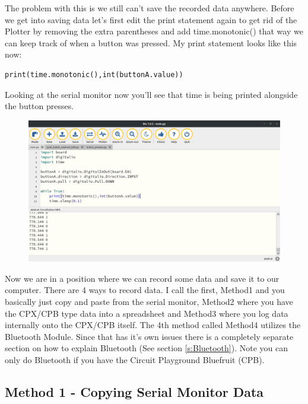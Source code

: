 The problem with this is we still can’t save the recorded data
anywhere. Before we get into saving data let’s first edit the print
statement again to get rid of the Plotter by removing the extra
parentheses and add time.monotonic() that way we can keep track of
when a button was pressed. My print statement looks like this now: 
\begin{verbatim}
print(time.monotonic(),int(buttonA.value))
\end{verbatim}
Looking at the serial monitor now you’ll see that time is being
printed alongside the button presses. 
\begin{figure}[H]
  \begin{center}
    \includegraphics[width=\textwidth]{Figures/MuPlotterTime.png}
  \end{center}
\end{figure}
Now we are in a position where we can record some data and save it to
our computer. There are 4 ways to record data. I call the first,
Method1 and you basically just copy and paste from the serial monitor,
Method2 where you have the CPX/CPB type data into a spreadsheet and
Method3 where you log data internally onto the CPX/CPB itself. The 4th
method called Method4 utilizes the Bluetooth Module. Since that has
it's own issues there is a completely separate section on how to
explain Bluetooth (See section \ref{s:Bluetooth}). Note you can only
do Bluetooth if you have the Circuit Playground Bluefruit (CPB). 

\subsection{Method 1 - Copying Serial Monitor Data}

